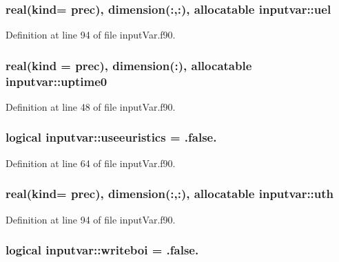 \hypertarget{classinputvar_a8540cf286b75c5a77a2c3f8e2623617a}{
\subsubsection[{uel}]{\setlength{\rightskip}{0pt plus 5cm}real(kind= prec), dimension(\-:,\-:), allocatable inputvar\-::uel}}\label{classinputvar_a8540cf286b75c5a77a2c3f8e2623617a}


Definition at line 94 of file input\-Var.\-f90.

\hypertarget{classinputvar_a3938be0ea72158eee837e2a8c08f29e0}{
\subsubsection[{uptime0}]{\setlength{\rightskip}{0pt plus 5cm}real(kind = prec), dimension(\-:), allocatable inputvar\-::uptime0}}\label{classinputvar_a3938be0ea72158eee837e2a8c08f29e0}


Definition at line 48 of file input\-Var.\-f90.

\hypertarget{classinputvar_a04f11d38b133803024202cc546abddc3}{
\subsubsection[{useeuristics}]{\setlength{\rightskip}{0pt plus 5cm}logical inputvar\-::useeuristics = .false.}}\label{classinputvar_a04f11d38b133803024202cc546abddc3}


Definition at line 64 of file input\-Var.\-f90.

\hypertarget{classinputvar_abd9a09032c8d997c45cd49020fb78609}{
\subsubsection[{uth}]{\setlength{\rightskip}{0pt plus 5cm}real(kind= prec), dimension(\-:,\-:), allocatable inputvar\-::uth}}\label{classinputvar_abd9a09032c8d997c45cd49020fb78609}


Definition at line 94 of file input\-Var.\-f90.

\hypertarget{classinputvar_adfc2c014d1631c831bd700d9ff13dcff}{
\subsubsection[{writeboi}]{\setlength{\rightskip}{0pt plus 5cm}logical inputvar\-::writeboi = .false.}}\label{classinputvar_adfc2c014d1631c831bd700d9ff13dcff}


